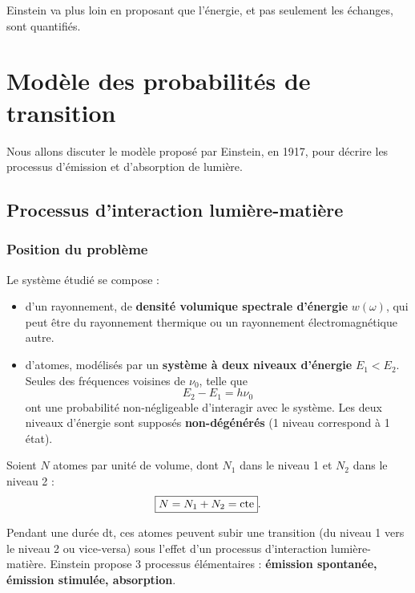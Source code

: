 \documentclass[11pt,a4paper]{report}
\begin{document}
Einstein va plus loin en proposant que l'énergie, et pas seulement les échanges, sont quantifiés.

\newpage
\section{Modèle des probabilités de transition}

Nous allons discuter le modèle proposé par Einstein, en 1917, pour décrire les processus d'émission et d'absorption de lumière.

\subsection{Processus d'interaction lumière-matière}

\subsubsection{Position du problème}

Le système étudié se compose :
\begin{itemize}
	\item d'un rayonnement, de \textbf{densité volumique spectrale d'énergie} $w(\omega)$,
	qui peut être du rayonnement thermique ou un rayonnement électromagnétique autre.
	\item d'atomes, modélisés par un \textbf{système à deux niveaux d'énergie} $E_1 < E_2$. Seules des 		fréquences voisines de $\nu_0$, telle que
	\begin{equation}
		\boxed{E_2 - E_1 = h\nu_0}	
	\end{equation}
	ont une probabilité non-négligeable d'interagir avec le système. Les deux niveaux d'énergie sont 		supposés \textbf{non-dégénérés} (1 niveau correspond à 1 état).\\
\end{itemize}

Soient $N$ atomes par unité de volume, dont $N_1$ dans le niveau 1 et $N_2$ dans le niveau 2 :
\begin{equation}
	\boxed{N = N_1 + N_2 = \text{cte}}.\\
\end{equation}

Pendant une durée dt, ces atomes peuvent subir une transition (du niveau 1 vers le niveau 2 ou vice-versa) sous l'effet d'un processus d'interaction lumière-matière. Einstein propose 3 processus élémentaires : \textbf{émission spontanée, émission stimulée, absorption}.\\
\end{document}
